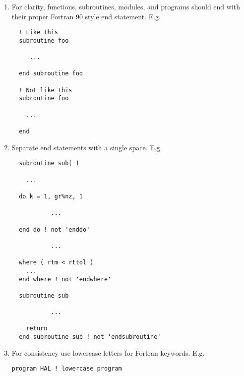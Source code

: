 \documentclass[letterpaper,12pt]{article}
\begin{document}
\begin{enumerate}
\item For clarity, functions, subroutines, modules, and programs should end 
with their proper Fortran 90 style end statement. \newline
E.g.
\begin{verbatim}
  ! Like this
  subroutine foo

     ...

  end subroutine foo

  ! Not like this
  subroutine foo

    ...

  end
\end{verbatim}

\item Separate end statements with a single space. \newline 
E.g.
\begin{verbatim}
  subroutine sub( )

    ...

  do k = 1, gr%nz, 1

           ...

  end do ! not 'enddo'

           ...

  where ( rtm < rttol )
    ...
  end where ! not 'endwhere'

  subroutine sub

           ...

    return
  end subroutine sub ! not 'endsubroutine'
\end{verbatim}



\item For consistency use lowercase letters for Fortran keywords. \newline
E.g.
\begin{verbatim}
program HAL ! lowercase program


\end{verbatim}
\end{enumerate}
\end{document}
